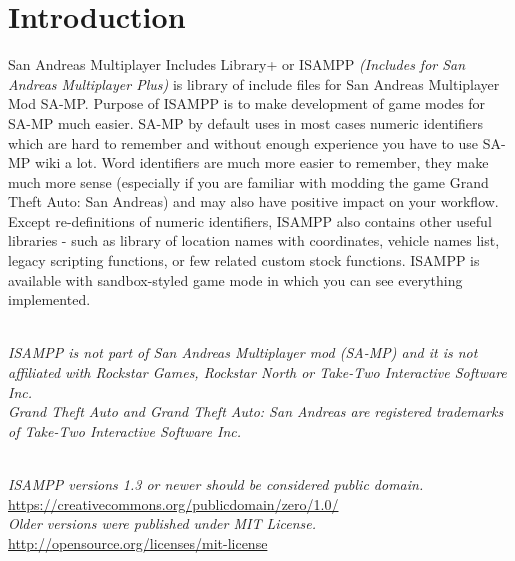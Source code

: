 \documentclass{article}
\begin{document}
\section{Introduction}
San Andreas Multiplayer Includes Library+ or ISAMPP \textit{(Includes for San Andreas Multiplayer Plus)} is library of include files for San Andreas Multiplayer Mod SA-MP. Purpose of ISAMPP is to make development of game modes for SA-MP much easier. SA-MP by default uses in most cases numeric identifiers which are hard to remember and without enough experience you have to use SA-MP wiki a lot. Word identifiers are much more easier to remember, they make much more sense (especially if you are familiar with modding the game Grand Theft Auto: San Andreas) and may also have positive impact on your workflow. Except re-definitions of numeric identifiers, ISAMPP also contains other useful libraries - such as library of location names with coordinates, vehicle names list, legacy scripting functions, or few related custom stock functions. ISAMPP is available with sandbox-styled game mode in which you can see everything implemented.

\textit{\\ISAMPP is not part of San Andreas Multiplayer mod (SA-MP) and it is not affiliated with Rockstar Games, Rockstar North or Take-Two Interactive Software Inc.}
\textit{\\Grand Theft Auto and Grand Theft Auto: San Andreas are registered trademarks of Take-Two Interactive Software Inc.}

\textit{\\ISAMPP versions 1.3 or newer should be considered public domain.}
\\\url{https://creativecommons.org/publicdomain/zero/1.0/}
\bigskip
\\\textit{Older versions were published under MIT License.}
\\\url{http://opensource.org/licenses/mit-license}
\end{document}
